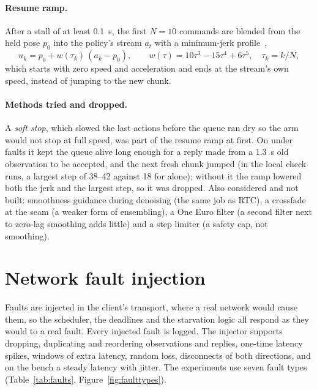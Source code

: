 \paragraph{Resume ramp.} After a stall of at least 0.1~s, the first $N=10$ commands are blended from the held pose
$p_0$ into the policy's stream $a_t$ with a minimum-jerk profile~\cite{flash1985},
\begin{equation}
  u_k = p_0 + w(\tau_k)\,(a_k - p_0), \qquad w(\tau) = 10\tau^3 - 15\tau^4 + 6\tau^5, \quad \tau_k = k/N,
\end{equation}
which starts with zero speed and acceleration and ends at the stream's own speed, instead of jumping to the new chunk.

\paragraph{Methods tried and dropped.} A \emph{soft stop}, which slowed the last actions before the queue ran dry so the
arm would not stop at full speed, was part of the resume ramp at first. On \smolvla{} under faults it kept the queue
alive long enough for a reply made from a 1.3~s old observation to be accepted, and the next fresh chunk jumped
(in the local check runs, a largest step of 38--42\degree{} against 18\degree{} for \drtc{} alone); without it the ramp lowered
both the jerk and the largest step, so it was dropped. Also considered and not built: smoothness guidance during
denoising (the same job as RTC), a crossfade at the seam (a weaker form of ensembling), a One Euro filter (a second
filter next to zero-lag smoothing adds little) and a step limiter (a safety cap, not smoothing).


\section{Network fault injection}\label{sec:faults}

Faults are injected in the client's transport, where a real network would cause them, so the scheduler, the deadlines
and the starvation logic all respond as they would to a real fault. Every injected fault is logged. The injector
supports dropping, duplicating and reordering observations and replies, one-time latency spikes, windows of extra
latency, random loss, disconnects of both directions, and on the bench a steady latency with jitter. The experiments
use seven fault types (Table~\ref{tab:faults}, Figure~\ref{fig:faulttypes}).

